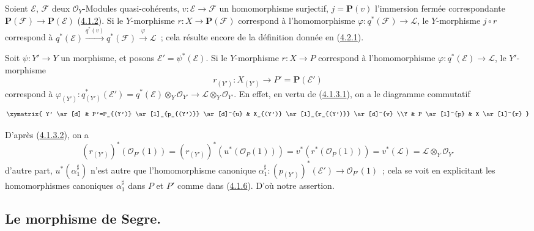 \begin{env}[4.2.9]
\label{II.4.2.9-fr}
Soient $\mathcal{E}$, $\mathcal{F}$ deux $\mathcal{O}_Y$-Modules
quasi-cohérents, $v:\mathcal{E}\to\mathcal{F}$ un homomorphisme surjectif,
$j=\mathbf{P}(v)$ l'immersion fermée correspondante
$\mathbf{P}(\mathcal{F})\to\mathbf{P}(\mathcal{E})$
(\hyperref[II.4.1.2-fr]{4.1.2}). Si le $Y$-morphisme
$r:X\to\mathbf{P}(\mathcal{F})$ correspond à l'homomorphisme
$\varphi:q^*(\mathcal{F})\to\mathcal{L}$, le
$Y$-morphisme $j\circ r$ correspond à
$q^*(\mathcal{E})\xrightarrow{q^*(v)}q^*(\mathcal{F})
\xrightarrow{\varphi}\mathcal{L}$~;
cela résulte encore de la définition donnée en
(\hyperref[II.4.2.1-fr]{4.2.1}).
\end{env}

\begin{env}[4.2.10]
\label{II.4.2.10-fr}
Soit $\psi:Y'\to Y$ un morphisme, et posons
$\mathcal{E}'=\psi^*(\mathcal{E})$. Si le $Y$-morphisme $r:X\to P$ correspond
à l'homomorphisme $\varphi:q^*(\mathcal{E})\to\mathcal{L}$, le
$Y'$-morphisme
\[
  r_{(Y')}:X_{(Y')}\longrightarrow P'=\mathbf{P}(\mathcal{E}')
\]
correspond à
$\varphi_{(Y')}:q_{(Y')}^*(\mathcal{E}')=
  q^*(\mathcal{E})\otimes_Y\mathcal{O}_{Y'}\to
\mathcal{L}\otimes_Y\mathcal{O}_{Y'}$. En effet, en vertu de
(\hyperref[II.4.1.3.1-fr]{4.1.3.1}), on a le diagramme commutatif
\[
  \xymatrix{
    Y' \ar[d]
    & P'=P_{(Y')} \ar[l]_{p_{(Y')}} \ar[d]^{u}
    & X_{(Y')} \ar[l]_{r_{(Y')}} \ar[d]^{v}
    \\Y
    & P \ar[l]^{p}
    & X \ar[l]^{r}
  }
\]

D'après (\hyperref[II.4.1.3.2-fr]{4.1.3.2}), on a
\[
  (r_{(Y')})^*(\mathcal{O}_{P'}(1))
  =(r_{(Y')})^*(u^*(\mathcal{O}_P(1)))
  =v^*(r^*(\mathcal{O}_P(1)))
  =v^*(\mathcal{L})=\mathcal{L}\otimes_Y\mathcal{O}_{Y'}
\]
d'autre part, $u^*(\alpha_1^\sharp)$ n'est autre que l'homomorphisme
canonique
$\alpha_1^\sharp:(p_{(Y')})^*(\mathcal{E}')\to\mathcal{O}_{P'}(1)$~; cela
se voit en explicitant les homomorphismes canoniques $\alpha_1^\sharp$ dans
$P$ et $P'$ comme dans (\hyperref[II.4.1.6-fr]{4.1.6}). D'où notre assertion.
\end{env}

\subsection{Le morphisme de Segre.}
\label{subsection:II.4.3-fr}

